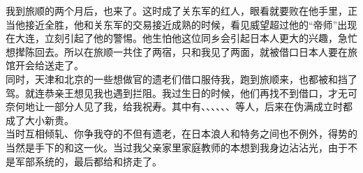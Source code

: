 我到旅顺的两个月后，也来了。这时成了关东军的红人，眼看就要败在他手里，正当他接近全胜，他和关东军的交易接近成熟的时候，看见威望超过他的“帝师”出现在大连，立刻引起了他的警惕。他生怕他这位同乡会引起日本人更大的兴趣，急忙想撵陈回去。所以在旅顺一共住了两宿，只和我见了两面，就被借口日本人要在旅馆开会给送走了。\\

同时，天津和北京的一些想做官的遗老们借口服侍我，跑到旅顺来，也都被和挡了驾。就连恭亲王想见我也遇到拦阻。我过生日的时候，他们再找不到借口，才无可奈何地让一部分人见了我，给我祝寿。其中有、、、、、、等人，后来在伪满成立时都成了大小新贵。\\

当时互相倾轧、你争我夺的不但有遗老，在日本浪人和特务之间也不例外，得势的当然是手下的和这一伙。当过我父亲家里家庭教师的本想到我身边沾沾光，由于不是军部系统的，最后都给和挤走了。\\

